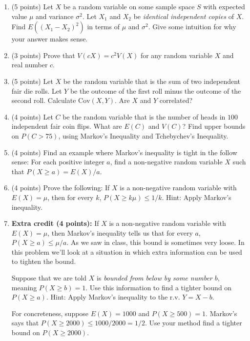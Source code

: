 \documentclass[11pt]{article}
\begin{document}
\begin{enumerate}


\item (5 points) Let $X$ be a random variable on some sample space $S$ with
expected value $\mu$ and variance $\sigma^2$.  Let $X_1$ and
$X_2$ be \emph{identical independent copies} of $X$.  Find
$E((X_1 - X_2)^2)$ in terms of $\mu$ and $\sigma^2$.  Give some intuition for why your answer makes sense.

\item (3 points) Prove that $V(cX) = c^2 V(X)$ for any random variable $X$ and
real number $c$.

\item (5 points) Let $X$ be the random variable that is the sum of two
independent fair die rolls.  Let $Y$ be the outcome of the first roll minus the
outcome of the second roll.  Calculate $\mathrm{Cov}(X,Y)$.
Are $X$ and $Y$ correlated?

\item (4 points) Let $C$ be the random variable that is the number of heads in
$100$ independent fair coin flips.  What are $E(C)$ and $V(C)$?  Find upper
bounds on $P(C > 75)$, using Markov's Inequality and Tchebychev's Inequality.

\item (4 points) Find an example where Markov's inequality is tight in the
follow sense: For each  positive integer $a$, find a non-negative random
variable $X$ such that $P(X\geq a) = E(X)/a$.

\item (4 points) Prove the following: If $X$ is a non-negative random variable
with $E(X) = \mu$, then for every $k$, $P(X \geq k\mu) \leq 1/k$.
\textsf{Hint:  Apply Markov's inequality.}

\item \textbf{Extra credit (4 points):} If $X$ is a non-negative
random variable with $E(X) = \mu$, then Markov's inequality tells us
that for every $a$, $P(X \geq a) \leq \mu/a$.  As we saw in class,
this bound is sometimes very loose.  In this problem we'll look at
a situation in which extra information can be used to tighten the
bound.

Suppose that we are told $X$ is \emph{bounded
from below by some number $b$}, meaning $P(X \geq b) = 1$.  Use this information
to find a tighter bound on $P(X \geq a)$.  \textsf{Hint:  Apply Markov's
inequality to the r.v.  $Y = X - b$.}

For concreteness, suppose $E(X) = 1000$ and $P(X \geq 500) = 1$.  Markov's
says that $P(X \geq 2000) \leq 1000/2000 = 1/2$.  Use your method find a
tighter bound on $P(X \geq 2000)$.

\end{enumerate}
\end{document}
